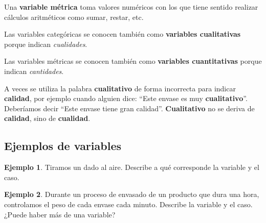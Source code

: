 \documentclass[
  letterpaper,
  DIV=11,
  numbers=noendperiod,
  oneside]{scrreprt}
\begin{document}
Una \textbf{variable métrica} toma valores numéricos con los que tiene
sentido realizar cálculos aritméticos como sumar, restar, etc.

Las variables categóricas se conocen también como \textbf{variables
cualitativas} porque indican \emph{cualidades}.

Las variables métricas se conocen también como \textbf{variables
cuantitativas} porque indican \emph{cantidades}.

\begin{tcolorbox}[enhanced jigsaw, colback=white, opacitybacktitle=0.6, leftrule=.75mm, opacityback=0, coltitle=black, colframe=quarto-callout-warning-color-frame, colbacktitle=quarto-callout-warning-color!10!white, bottomrule=.15mm, title=\textcolor{quarto-callout-warning-color}{\faExclamationTriangle}\hspace{0.5em}{Comentario: ¿Cualitativo quiere decir ``que tiene calidad''?}, bottomtitle=1mm, toptitle=1mm, breakable, left=2mm, arc=.35mm, titlerule=0mm, rightrule=.15mm, toprule=.15mm]

A veces se utiliza la palabra \textbf{cualitativo} de forma incorrecta
para indicar \textbf{calidad}, por ejemplo cuando alguien dice: ``Este
envase es muy \textbf{cualitativo}''. Deberíamos decir ``Este envase
tiene gran calidad''. \textbf{Cualitativo} no se deriva de
\textbf{calidad}, sino de \textbf{cualidad}.

\end{tcolorbox}

\hypertarget{ejemplos-de-variables}{%
\subsection{Ejemplos de variables}\label{ejemplos-de-variables}}

\begin{tcolorbox}[enhanced jigsaw, colback=white, opacitybacktitle=0.6, leftrule=.75mm, opacityback=0, coltitle=black, colframe=quarto-callout-note-color-frame, colbacktitle=quarto-callout-note-color!10!white, bottomrule=.15mm, title={Para resolver}, bottomtitle=1mm, toptitle=1mm, breakable, left=2mm, arc=.35mm, titlerule=0mm, rightrule=.15mm, toprule=.15mm]

\textbf{Ejemplo 1}. Tiramos un dado al aire. Describe a qué corresponde
la variable y el caso.

\textbf{Ejemplo 2}. Durante un proceso de envasado de un producto que
dura una hora, controlamos el peso de cada envase cada minuto. Describe
la variable y el caso. ¿Puede haber más de una variable?

\end{tcolorbox}
\end{document}
